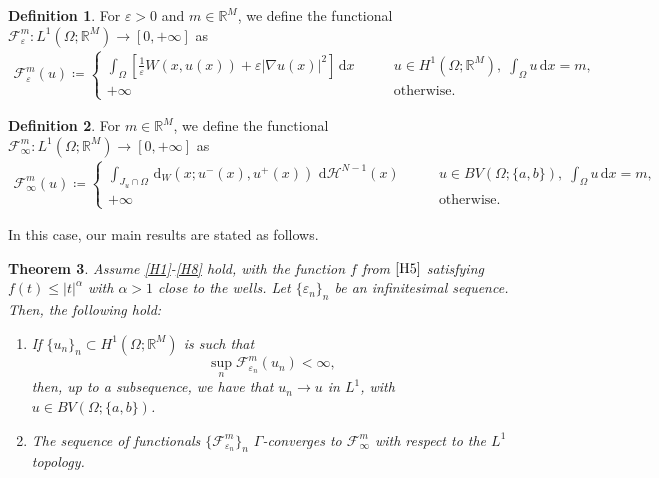 \documentclass[a4paper, 11pt, reqno]{amsart}
\theoremstyle{plain}
\newtheorem{theorem}{Theorem}[section]
\theoremstyle{definition}
\newtheorem{definition}[theorem]{Definition}
\theoremstyle{remark}
\newcommand{\R}{\mathbb R}
\newcommand{\dd}{\,\mathrm{d}}
\newcommand{\dhno}{\,\dd{\mathcal H}^{N-1}}
\newcommand{\e}{\varepsilon}
\begin{document}
\begin{definition}
For $\varepsilon>0$ and $m\in\R^M$, we define the functional $\mathcal{F}_\varepsilon^m\colon L^1(\Omega;\R^M)\to[0,+\infty]$ as
\begin{gather*}
    \mathcal{F}_\varepsilon^m(u) \coloneqq \begin{cases}
        \displaystyle\int_\Omega \left[ \frac{1}{\varepsilon} W(x,u(x)) + \varepsilon|\nabla u(x)|^2 \right] \dd x \qquad &u \in H^1 (\Omega; \R^M), \; \displaystyle\int_\Omega u \dd x = m,\\
        + \infty \qquad &\text{otherwise}.
    \end{cases}
\end{gather*}
\end{definition}

\begin{definition}
For $m\in\R^M$, we define the functional $\mathcal{F}_\infty^m\colon L^1(\Omega;\R^M)\to[0,+\infty]$ as
\begin{gather*}
    \mathcal{F}_\infty^m (u) \coloneqq \begin{cases}
        \displaystyle\int_{J_u\cap \Omega} \dd_W(x; u^-(x), u^+(x)) \dhno(x) \qquad &u \in BV(\Omega; \{a,b\}), \; \displaystyle\int_\Omega u \dd x = m,\\
        + \infty \qquad &\text{otherwise.}
    \end{cases}
\end{gather*}
\end{definition}

In this case, our main results are stated as follows.

\begin{theorem}\label{thm:Gamma_conv_mass_constraint}
Assume \ref{H1}-\ref{H8} hold, with the function $f$ from $\ref{H5}$ satisfying $f(t) \leq |t|^\alpha$ with $\alpha > 1$ close to the wells.
Let $\{ \e_n\}_n$ be an infinitesimal sequence.
Then, the following hold:
\begin{enumerate}
    \item If $\{ u_n \}_n \subset H^1 (\Omega; \R^M)$ is such that
    $$ \sup_n \mathcal{F}_{\varepsilon_n}^m (u_n) < \infty, $$
    then, up to a subsequence, we have that $u_n \to u$ in $L^1$, with $ u \in BV(\Omega; \{ a, b\})$.
    \item The sequence of functionals $\{ \mathcal{F}_{\varepsilon_n}^m \}_n $ $\Gamma$-converges to $\mathcal{F}_\infty^m$ with respect to the $L^1$ topology.
\end{enumerate}
\end{theorem}
\end{document}
